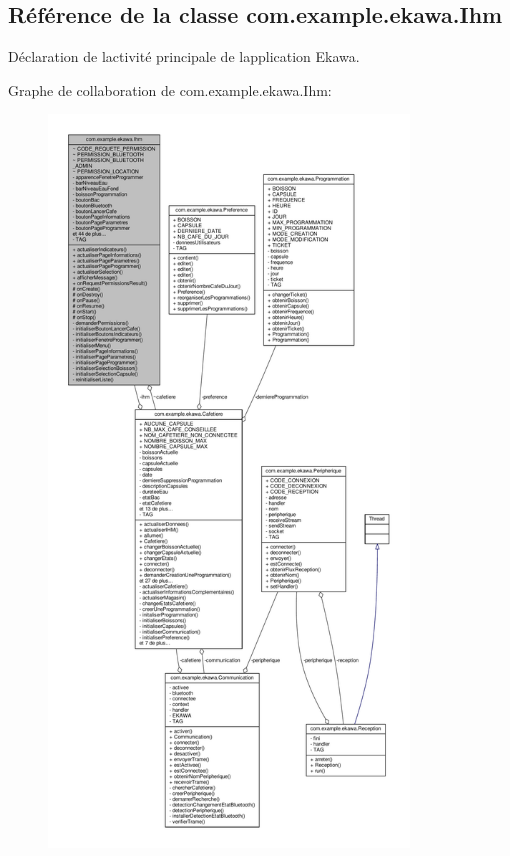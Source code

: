 \hypertarget{classcom_1_1example_1_1ekawa_1_1_ihm}{}\subsection{Référence de la classe com.\+example.\+ekawa.\+Ihm}
\label{classcom_1_1example_1_1ekawa_1_1_ihm}


Déclaration de l\textquotesingle{}activité principale de l\textquotesingle{}application Ekawa.  




Graphe de collaboration de com.\+example.\+ekawa.\+Ihm\+:\nopagebreak
\begin{figure}[H]
\begin{center}
\leavevmode
\includegraphics[height=550pt]{classcom_1_1example_1_1ekawa_1_1_ihm__coll__graph}
\end{center}
\end{figure}
